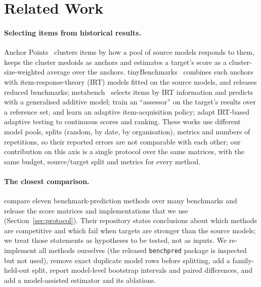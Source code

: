 \section{Related Work}
\label{sec:related}

\paragraph{Selecting items from historical results.}
Anchor Points~\citep{vivek2024anchor} clusters items by how a pool of source models responds to them, keeps the cluster medoids as anchors and estimates a target's score as a cluster-size-weighted average over the anchors.
tinyBenchmarks~\citep{polo2024tiny} combines such anchors with item-response-theory (IRT) models fitted on the source models, and releases reduced benchmarks;
metabench~\citep{kipnis2025metabench} selects items by IRT information and predicts with a generalised additive model;
\citet{pacchiardi2024100} train an ``assessor'' on the target's results over a reference set, and \citet{li2025active} learn an adaptive item-acquisition policy; \citet{balkir2026confident} adapt IRT-based adaptive testing to continuous scores and ranking.
These works use different model pools, splits (random, by date, by organisation), metrics and numbers of repetitions, so their reported errors are not comparable with each other;
our contribution on this axis is a single protocol over the same matrices, with the same budget, source/target split and metrics for every method.

\paragraph{The closest comparison.}
\citet{zhang2025benchmark} compare eleven benchmark-prediction methods over many benchmarks and release the score matrices and implementations that we use (Section~\ref{sec:protocol}).
Their repository states conclusions about which methods are competitive and which fail when targets are stronger than the source models; we treat those statements as hypotheses to be tested, not as inputs.
We re-implement all methods ourselves (the released \texttt{benchpred} package is inspected but not used), remove exact duplicate model rows before splitting, add a family-held-out split, report model-level bootstrap intervals and paired differences, and add a model-assisted estimator and its ablations.

